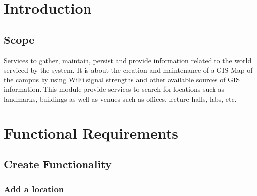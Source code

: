\documentclass[runningheads,a4paper]{article}
\begin{document}
\begingroup

\tableofcontents
{}
\endgroup
\newpage

\section{Introduction}

\subsection{Scope}
Services to gather, maintain, persist and provide information related to the world
serviced by the system. It is about the creation and maintenance of a GIS Map of the
campus by using WiFi signal strengths and other available sources of GIS
information.
This module provide services to search for locations such as landmarks, buildings as
well as venues such as offices, lecture halls, labs, etc.
 
\section{Functional Requirements}
\subsection{Create Functionality}
\subsubsection{Add a location}
\end{document}
